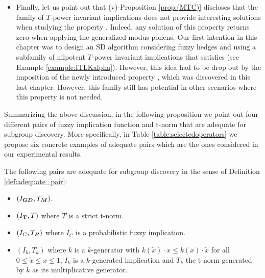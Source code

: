 \begin{itemize}
	\item Finally, let us point out that (v)-Proposition \ref{prop:(MTC)} discloses that the family of $T$-power invariant implications does not provide interesting solutions when studying the property \MTC. Indeed, any solution of this property returns zero when applying the generalized modus ponens. Our first intention in this chapter was to design an SD algorithm considering fuzzy hedges and using a subfamily of nilpotent $T$-power invariant implications that satisfies \TC (see Example \ref{example:ITLKalpha}). However, this idea had to be drop out by the imposition of the newly introduced property \MTC, which was discovered in this last chapter. However, this family still has potential in other scenarios where this property is not needed.
\end{itemize}

Summarizing the above discussion, in the following proposition we point out four different pairs of fuzzy implication function and t-norm that are adequate for subgroup discovery. More specifically, in Table \ref{table:selectedoperators} we propose six concrete examples of adequate pairs which are the ones considered in our experimental results.

\begin{proposition}\label{prop:adequate_pairs}
The following pairs are adequate for subgroup discovery in the sense of Definition \ref{def:adequate_pair}:
	\begin{itemize}
		\item $(I_{\bm{GD}}, T_{\bm{M}})$.
		\item $(I_{\bf T},T)$ where $T$ is a strict t-norm.
		\item $(I_C,T_{\bm{P}})$ where $I_C$ is a probabilistic fuzzy implication.
		\item $(I_k,T_k)$ where $k$ is a $k$-generator with $k(\tilde{x})\cdot x \leq k(x) \cdot \tilde{x}$ for all $0\leq \tilde{x} \leq x \leq 1$, $I_k$ is a $k$-generated implication and $T_k$ the t-norm generated by $k$ as its multiplicative generator.
	\end{itemize}
\end{proposition}

